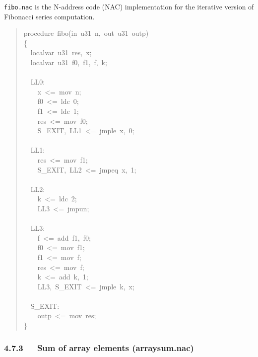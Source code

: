 \documentclass[a4paper]{article}
\begin{document}
\texttt{fibo.nac} is the N-address code (NAC) implementation for the iterative
version of Fibonacci series computation.
%
\begin{quote}{\ttfamily \raggedright \noindent
procedure~fibo(in~u31~n,~out~u31~outp)\\
\{\\
~~localvar~u31~res,~x;\\
~~localvar~u31~f0,~f1,~f,~k;\\
~\\
~~LL0:\\
~~~~x~<=~mov~n;\\
~~~~f0~<=~ldc~0;\\
~~~~f1~<=~ldc~1;\\
~~~~res~<=~mov~f0;\\
~~~~S\_EXIT,~LL1~<=~jmple~x,~0;\\
~\\
~~LL1:\\
~~~~res~<=~mov~f1;\\
~~~~S\_EXIT,~LL2~<=~jmpeq~x,~1;\\
~\\
~~LL2:\\
~~~~k~<=~ldc~2;\\
~~~~LL3~<=~jmpun;\\
~\\
~~LL3:\\
~~~~f~<=~add~f1,~f0;\\
~~~~f0~<=~mov~f1;\\
~~~~f1~<=~mov~f;\\
~~~~res~<=~mov~f;\\
~~~~k~<=~add~k,~1;\\
~~~~LL3,~S\_EXIT~<=~jmple~k,~x;\\
~\\
~~S\_EXIT:\\
~~~~outp~<=~mov~res;\\
\}
}
\end{quote}


\subsubsection{4.7.3~~~Sum of array elements (arraysum.nac)%
  \label{sum-of-array-elements-arraysum-nac}%
}
\end{document}
